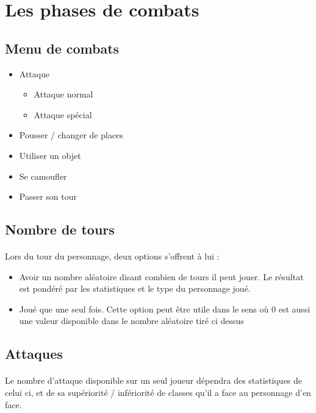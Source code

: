\newpage
\section{Les phases de combats}

\subsection{Menu de combats}
\begin{itemize}
	\item Attaque \begin{itemize}
				      \item Attaque normal
					  \item Attaque spécial
				  \end{itemize}
	\item Pousser / changer de places
	\item Utiliser un objet
	\item Se camoufler
	\item Passer son tour
\end{itemize}

\subsection{Nombre de tours} 
\paragraph{} Lors du tour du personnage, deux options s'offrent à lui : 
\begin{itemize}
	\item Avoir un nombre aléatoire disant combien de tours il peut jouer. Le résultat est pondéré par les statistiques et le type du personnage joué. 

	\item Joué que une seul fois. Cette option peut être utile dans le sens où 0 est aussi une valeur disponible dans le nombre aléatoire tiré ci dessus
\end{itemize}

\subsection{Attaques}
\paragraph{} Le nombre d'attaque disponible sur un seul joueur dépendra des statistiques de celui ci, et de sa supériorité / infériorité de classes qu'il a face au personnage d'en face.

